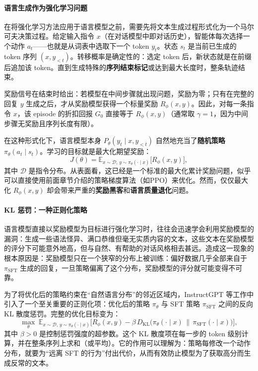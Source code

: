 \paragraph{语言生成作为强化学习问题}

在将强化学习方法应用于语言模型之前，需要先将文本生成过程形式化为一个马尔可夫决策过程。给定输入指令 $x$（在对话模型中即对话历史），智能体每次选择一个动作 $a_t$——也就是从词表中选取下一个 token $y_t$。状态 $s_t$ 是当前已生成的 token 序列 $(x, y_{<t})$。转移概率是确定性的：选定 token 后，新状态就是在前缀后追加该 token。直到生成特殊的\textbf{序列结束标记}或达到最大长度时，整条轨迹结束。

奖励信号在结束时给出：若模型在中间步骤就出现问题，奖励为零；只有在完整的回复 $y$ 生成之后，才从奖励模型获得一个标量奖励 $R_\phi(x, y)$。因此，对每一条指令 $x$，该 episode 的折扣回报 $G_0$ 直接等于 $R_\phi(x, y)$（通常取 $\gamma = 1$，因为中间步骤无奖励且序列长度有限）。

在这种形式化下，语言模型本身 $P_\theta(y_t \mid x, y_{<t})$ 自然地充当了\textbf{随机策略} $\pi_\theta(a_t \mid s_t)$。学习的目标就是最大化期望奖励：
\begin{equation}
    J(\theta) = \mathbb{E}_{x \sim \mathcal{D}, \, y \sim \pi_\theta(\cdot \mid x)}\big[ R_\phi(x, y) \big],
\end{equation}
其中 $\mathcal{D}$ 是指令分布。从表面看，这已经是一个标准的最大化累计奖励问题，似乎可以直接使用前面章节介绍的策略梯度算法（如PPO）来优化。然而，仅仅最大化 $R_\phi(x, y)$ 却会带来严重的\textbf{奖励黑客}和\textbf{语言质量退化}问题。

\paragraph{KL 惩罚：一种正则化策略}

语言模型直接以奖励模型为目标进行强化学习时，往往会迅速学会利用奖励模型的漏洞：生成一些语法怪异、满口恭维但毫无实质内容的文本，这些文本在奖励模型的评分下可能意外地高，但与自然、有帮助的对话风格相去甚远\cite{ouyang2022traininglanguagemodelsfollow,stiennon2020learning}。造成这一现象的根本原因是：奖励模型只在一个狭窄的分布上被训练：偏好数据几乎全部来自于 $\pi_{\text{SFT}}$ 生成的回复，一旦策略偏离了这个分布，奖励模型的评分就可能变得不可靠。

为了将优化后的策略约束在“自然语言分布”的邻近区域内，InstructGPT 等工作中引入了一个至关重要的正则化项：优化后的策略 $\pi_\theta$ 与 SFT 策略 $\pi_{\text{SFT}}$ 之间的反向 KL 散度惩罚。完整的优化目标变为：
\begin{equation}\label{eq:rlhf_objective}
    \max_\theta \; \mathbb{E}_{x \sim \mathcal{D}, \, y \sim \pi_\theta(\cdot \mid x)}\Big[ R_\phi(x, y) - \beta \, D_{\text{KL}}\big( \pi_\theta(\cdot \mid x) \,\|\, \pi_{\text{SFT}}(\cdot \mid x) \big) \Big],
\end{equation}
其中 $\beta > 0$ 是控制惩罚强度的超参数。这个 KL 散度项在每一步的 token 级别计算，并在整条序列上求和（或平均）。它的作用可以理解为：策略每修改一个动作分布，就要为“远离 SFT 的行为”付出代价，从而有效防止模型为了获取高分而生成反常的文本。

